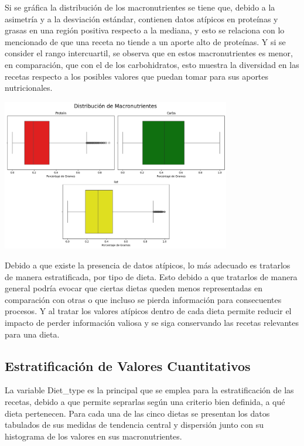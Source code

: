 \documentclass[12pt,a4paper]{article}
\begin{document}
    Si se gráfica la distribución de los macronutrientes se tiene que, debido 
    a la asimetría y a la desviación estándar, contienen datos atípicos en proteínas y grasas en una región 
    positiva respecto a la mediana, y esto se relaciona con lo mencionado de que 
    una receta no tiende a un aporte alto de proteínas. Y si se consider el rango 
    intercuartil, se observa que en estos macronutrientes es menor, en comparación, 
    que con el de los carbohidratos, esto muestra la diversidad en las recetas respecto 
    a los posibles valores que puedan tomar para sus aportes nutricionales.
    \begin{center}
        \includegraphics[width=0.75\textwidth]{Resources/2_02_plot_01.png}
    \end{center}

    Debido a que existe la presencia de datos atípicos, lo más adecuado es tratarlos 
    de manera estratificada, por tipo de dieta. Esto debido a que tratarlos de manera 
    general podría evocar que ciertas dietas queden menos representadas en comparación 
    con otras o que incluso se pierda información para consecuentes procesos. Y al 
    tratar los valores atípicos dentro de cada dieta permite reducir el impacto de 
    perder información valiosa y se siga conservando las recetas relevantes para una dieta.

    \subsection{Estratificación de Valores Cuantitativos}
    La variable Diet\_type es la principal que se emplea para la 
    estratificación de las recetas, debido a que permite seprarlas 
    según una criterio bien definida, a qué dieta pertenecen. Para cada 
    una de las cinco dietas se presentan los datos tabulados de sus 
    medidas de tendencia central y dispersión junto con su histograma 
    de los valores en sus macronutrientes.\\
\end{document}

